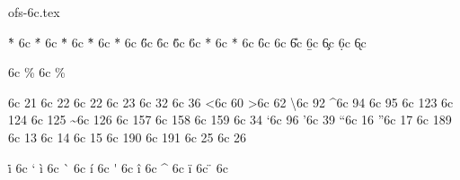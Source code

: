 

\protectreading ofs-6c.tex %

\accentdef  \` *    6c  {}
\accentdef  \' *    6c  {}
\accentdef  \^ *    6c  {}
\accentdef  \~ *    6c  {}
\accentdef  \" *    6c  {}
\accentdef  \H *    6c  {}
\accentdef  \r *    6c  {}
\accentdef  \v *    6c  {}
\accentdef  \u *    6c  {}
\accentdef  \= *    6c  {}
\accentdef  \. *    6c  {}
\accentdef  \f *    6c  {}
\accentdef  \C *    6c  {}
\accentdef  \U *    6c  {}
\accentdef  \b *    6c  {}
\accentdef  \c *    6c  {}
\accentdef  \d *    6c  {}
\accentdef  \k *    6c  {}

\let\promile=\relax
\characterdef \promile          6c {\% }        
\characterdef \pertenthousand   6c {\% } 

\characterdef \textendash         6c  21
\characterdef \cyrdash            6c  22
\characterdef \textemdash         6c  22
\characterdef \textcompwordmark   6c  23
\characterdef \textvisiblespace   6c  32
\characterdef \textdollar         6c  36
\characterdef \textless           6c  60
\characterdef \textgreater        6c  62
\characterdef \textbackslash      6c  92
\characterdef \textasciicircum    6c  94
\characterdef \textunderscore     6c  95
\characterdef \textbraceleft      6c  123
\characterdef \textbar            6c  124
\characterdef \textbraceright     6c  125
\characterdef \textasciitilde     6c  126
\characterdef \textnumero         6c  157
\characterdef \textcurrency       6c  158
\characterdef \textsection        6c  159
\characterdef \textquotedbl       6c  34
\characterdef \textquoteleft      6c  96
\characterdef \textquoteright     6c  39
\characterdef \textquotedblleft   6c  16
\characterdef \textquotedblright  6c  17
\characterdef \quotedblbase       6c  189
\characterdef \CYRpalochka        6c  13
\characterdef \cyrlangle          6c  14
\characterdef \cyrrangle          6c  15
\characterdef \guillemotleft      6c  190
\characterdef \guillemotright     6c  191
\characterdef \dotlessi           6c   25
\characterdef \dotlessj           6c   26

\let\i=\dotlessi \let\j=\dotlessj
\accentdef  \. i     6c  `\i
\accentdef  \` i     6c  { \i}
\accentdef  \` {\i}  6c  { \i}
\accentdef  \' i     6c  { \i}
\accentdef  \' {\i}  6c  { \i}
\accentdef  \^ i     6c  { \i}
\accentdef  \^ {\i}  6c  { \i}
\accentdef  \" i     6c  { \i}
\accentdef  \" {\i}  6c  { \i}

